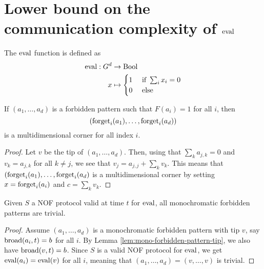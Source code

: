 \chapter{Lower bound on the communication complexity of $\operatorname{eval}$}

\begin{definition}
  \label{def:eval}
  \leanok

  The $\operatorname{eval}$ function is defined as
  \begin{align}
      \operatorname{eval} : G^d & \to \operatorname{Bool} \\
      x & \mapsto \begin{cases}
      1 & \text{ if } \sum_i x_i = 0 \\
      0 & \text{ else}
    \end{cases}
  \end{align}
\end{definition}

\begin{lemma}
  \label{lem:forbidden-pattern-project-multicorner}

  If $(a_1, \dots, a_d)$ is a forbidden pattern such that $F(a_i) = 1$ for all $i$, then
  $$(\operatorname{forget}_i(a_1), \dots, \operatorname{forget}_i(a_d))$$
  is a multidimensional corner for all index $i$.
\end{lemma}
\begin{proof}

  Let $v$ be the tip of $(a_1, \dots, a_d)$. Then, using that $\sum_k a_{j, k} = 0$ and $v_k = a_{j, k}$ for all $k \ne j$, we see that $v_j = a_{j, j} + \sum_k v_k$. This means that $(\operatorname{forget}_i(a_1), \dots, \operatorname{forget}_i(a_d)$ is a multidimensional corner by setting $x = \operatorname{forget}_i(a_i)$ and $c = \sum_k v_k$.
\end{proof}

\begin{lemma}
  \label{lem:mono-forbidden-pattern-trivial}
  \leanok

  Given $S$ a NOF protocol valid at time $t$ for $\operatorname{eval}$, all monochromatic forbidden patterns are trivial.
\end{lemma}
\begin{proof}
  \leanok

  Assume $(a_1, \dots, a_d)$ is a monochromatic forbidden pattern with tip $v$, say $\operatorname{broad}(a_i, t) = b$ for all $i$. By Lemma \ref{lem:mono-forbidden-pattern-tip}, we also have $\operatorname{broad}(v, t) = b$. Since $S$ is a valid NOF protocol for $\operatorname{eval}$, we get $\operatorname{eval}(a_i) = \operatorname{eval}(v)$ for all $i$, meaning that $(a_1, \dots, a_d) = (v, \dots, v)$ is trivial.
\end{proof}
